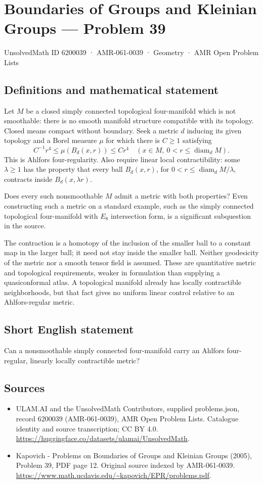 \documentclass[11pt,a4paper]{article}
\begin{document}
\section*{Boundaries of Groups and Kleinian Groups — Problem 39}\label{6200039}
{\small UnsolvedMath ID 6200039 · AMR-061-0039 · Geometry · AMR Open Problem Lists}
\subsection{Definitions and mathematical statement}
Let $M$ be a closed simply connected topological four-manifold which is not smoothable: there is no smooth manifold structure compatible with its topology. Closed means compact without boundary. Seek a metric $d$ inducing its given topology and a Borel measure $\mu$ for which there is $C\geq1$ satisfying
\[
 C^{-1}r^4\leq\mu(B_d(x,r))\leq Cr^4
 \quad(x\in M,\ 0<r\leq\operatorname{diam}_dM).
\]
This is Ahlfors four-regularity. Also require linear local contractibility: some $\lambda\geq1$ has the property that every ball $B_d(x,r)$, for $0<r\leq\operatorname{diam}_dM/\lambda$, contracts inside $B_d(x,\lambda r)$.

Does every such nonsmoothable $M$ admit a metric with both properties? Even constructing such a metric on a standard example, such as the simply connected topological four-manifold with $E_8$ intersection form, is a significant subquestion in the source.

The contraction is a homotopy of the inclusion of the smaller ball to a constant map in the larger ball; it need not stay inside the smaller ball. Neither geodesicity of the metric nor a smooth tensor field is assumed. These are quantitative metric and topological requirements, weaker in formulation than supplying a quasiconformal atlas. A topological manifold already has locally contractible neighborhoods, but that fact gives no uniform linear control relative to an Ahlfors-regular metric.
\subsection{Short English statement}
Can a nonsmoothable simply connected four-manifold carry an Ahlfors four-regular, linearly locally contractible metric?
\subsection{Sources}
\begin{itemize}
\item[S1] ULAM.AI and the UnsolvedMath Contributors, supplied problems.json, record 6200039 (AMR-061-0039), AMR Open Problem Lists. Catalogue identity and source transcription; CC BY 4.0.
\url{https://huggingface.co/datasets/ulamai/UnsolvedMath}.
\item[S2] Kapovich - Problems on Boundaries of Groups and Kleinian Groups (2005), Problem 39, PDF page 12. Original source indexed by AMR-061-0039.
\url{https://www.math.ucdavis.edu/~kapovich/EPR/problems.pdf}.
\end{itemize}
\end{document}

